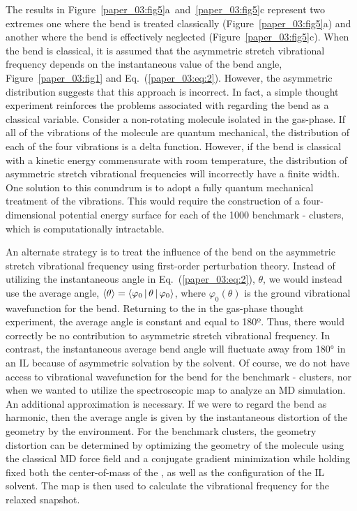 The results in Figure~\ref{paper_03:fig5}a~and~\ref{paper_03:fig5}c represent two extremes \textemdash{} one where the  bend is treated classically (Figure~\ref{paper_03:fig5}a) and another where the  bend is effectively neglected (Figure~\ref{paper_03:fig5}c). When the  bend is classical, it is assumed that the  asymmetric stretch vibrational frequency depends on the instantaneous value of the bend angle, Figure~\ref{paper_03:fig1} and Eq.~(\ref{paper_03:eq:2}). However, the asymmetric distribution suggests that this approach is incorrect. In fact, a simple thought experiment reinforces the problems associated with regarding the  bend as a classical variable. Consider a non-rotating  molecule isolated in the gas-phase. If all of the vibrations of the  molecule are quantum mechanical, the distribution of each of the four vibrations is a delta function. However, if the bend is classical with a kinetic energy commensurate with room temperature, the distribution of asymmetric stretch vibrational frequencies will incorrectly have a finite width. One solution to this conundrum is to adopt a fully quantum mechanical treatment of the  vibrations. This would require the construction of a four-dimensional potential energy surface for each of the 1000 benchmark -\ce{[C4C1im][PF6]} clusters, which is computationally intractable.

An alternate strategy is to treat the influence of the  bend on the asymmetric stretch vibrational frequency using first-order perturbation theory. Instead of utilizing the instantaneous  angle in Eq.~(\ref{paper_03:eq:2}), \(\theta\), we would instead use the average angle, \(\Braket{\theta} = \Braket{ \varphi_{0} | \theta | \varphi_{0} }\), where \(\varphi_{0}(\theta)\) is the ground vibrational wavefunction for the  bend. Returning to the  in the gas-phase thought experiment, the average angle is constant and equal to 180º. Thus, there would correctly be no contribution to  asymmetric stretch vibrational frequency. In contrast, the instantaneous average bend angle will fluctuate away from \ang{180} in an IL because of asymmetric solvation by the solvent. Of course, we do not have access to vibrational wavefunction for the  bend for the benchmark -\ce{[C4C1im][PF6]} clusters, nor when we wanted to utilize the spectroscopic map to analyze an MD simulation. An additional approximation is necessary. If we were to regard the  bend as harmonic, then the average angle is given by the instantaneous distortion of the  geometry by the environment. For the benchmark clusters, the geometry distortion can be determined by optimizing the geometry of the  molecule using the classical MD force field and a conjugate gradient minimization while holding fixed both the center-of-mass of the , as well as the configuration of the IL solvent. The map is then used to calculate the vibrational frequency for the relaxed snapshot.

